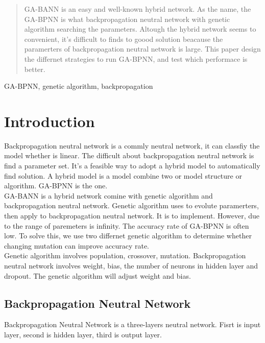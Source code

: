 \documentclass[conference]{IEEEtran}
\begin{document}
\begin{abstract}
GA-BANN is an easy and well-known hybrid network. As the name, the GA-BPNN is what backpropagation neutral network with genetic algorithm searching the parameters. Altough the hybrid network seems to convenient, it's difficult to finds to goood solution beacause the paramerters of backpropagation neutral network is large. This paper design the differnet strategies to run GA-BPNN, and test which performace is better. 
\end{abstract}

\begin{IEEEkeywords}
GA-BPNN, genetic algorithm, backpropagation
\end{IEEEkeywords}

\section{Introduction}
Backpropagation neutral network is a commly neutral network, it can classfiy the model whether is linear. The difficult about backpropagation neutral network is find a parameter set. It's a feasible way to adopt a hybrid model to automatically find solution. A hybrid model is a model combine two or model structure or algorithm. GA-BPNN is the one.\\

GA-BANN is a hybrid network comine with genetic algorithm and backpropagation neutral network. Genetic algorithm uses to evolute paramerters, then apply to backpropagation neutral network. It is to implement. However, due to the range of paremeters is infinity. The accuracy rate of GA-BPNN is often low. To solve this, we use two differnet genetic algorithm to determine whether changing mutation can improve accuracy rate.\\

Genetic algorithm involves population, crossover, mutation. Backpropagation neutral network involves weight, bias, the number of neurons in hidden layer and dropout. The genetic algorithm will adjust weight and bias.\\ 

\subsection{Backpropagation Neutral Network}
Backpropagation Neutral Network is a three-layers neutral network. Fisrt is input layer, second is hidden layer, third is output layer.\cite{b2}\\
\end{document}
